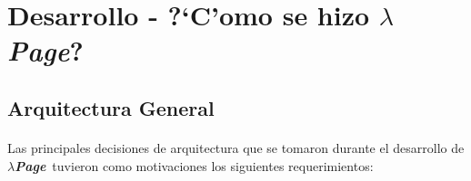 \documentclass[a4paper]{article}
\newcommand{\hpage}{\textbf{\textsl{$\lambda$Page}}}
\begin{document}
\newpage
\section{Desarrollo - ?`C'omo se hizo \hpage?}
\subsection{Arquitectura General}
\begin{epigraphs}
\end{epigraphs}
\paragraph{}Las principales decisiones de arquitectura que se tomaron durante el desarrollo de \hpage\ tuvieron como motivaciones los siguientes requerimientos:
\end{document}
